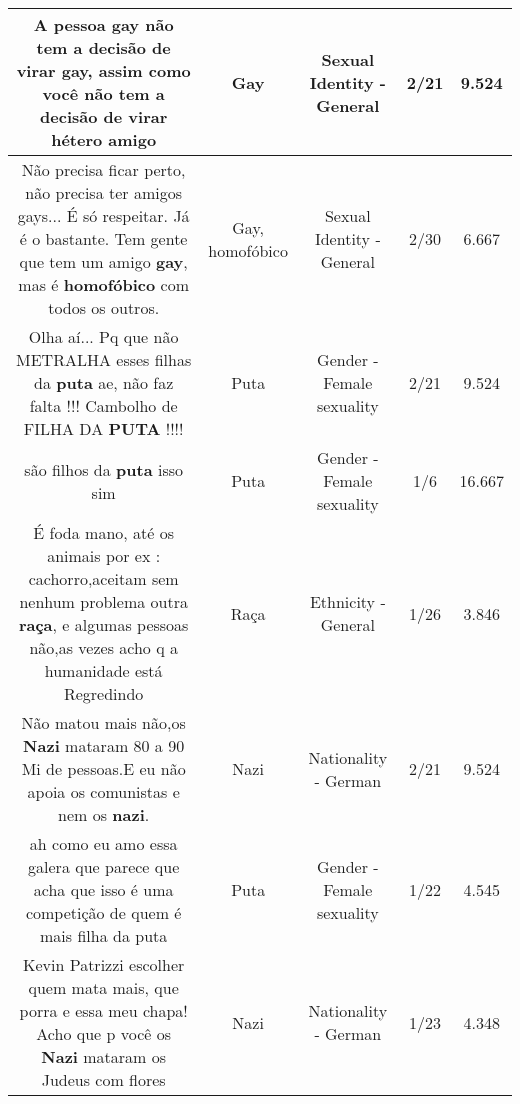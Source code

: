 \documentclass[11pt]{article}
\newlength\mylength
\begin{document}
\begin{center}
\begin{longtable}{|C{.65\mylength}|C{.30\mylength}|C{.12\mylength}|C{.12\mylength}|C{.12\mylength}|}
  \small A pessoa \textbf{gay} não tem a decisão de virar \textbf{gay}, assim como você não tem a decisão de virar hétero amigo\normalsize   & Gay & Sexual Identity - General & 2/21 & 9.524 \\  \hline
  \small Não precisa ficar perto, não precisa ter amigos gays... É só respeitar. Já é o bastante. Tem gente que tem um amigo \textbf{gay}, mas é \textbf{homofóbico} com todos os outros.\normalsize   & Gay, homofóbico & Sexual Identity - General & 2/30 & 6.667 \\  \hline
  \small Olha aí... Pq que não METRALHA esses filhas da \textbf{puta} ae, não faz falta !!! Cambolho de FILHA DA \textbf{PUTA} !!!!\normalsize   & Puta & Gender - Female sexuality & 2/21 & 9.524 \\  \hline
  \small são filhos da \textbf{puta} isso sim\normalsize   & Puta & Gender - Female sexuality & 1/6 & 16.667 \\  \hline
  \small É foda mano, até os animais por ex : cachorro,aceitam sem nenhum problema outra \textbf{raça}, e algumas pessoas não,as vezes acho q a humanidade está Regredindo\normalsize   & Raça & Ethnicity - General & 1/26 & 3.846 \\  \hline
  \small Não matou mais não,os \textbf{Nazi} mataram 80 a 90 Mi de pessoas.E eu não apoia os comunistas e nem os \textbf{nazi}.\normalsize   & Nazi & Nationality - German & 2/21 & 9.524 \\  \hline
  \small ah como eu amo essa galera que parece que acha que isso é uma competição de quem é mais filha da puta\normalsize   & Puta & Gender - Female sexuality & 1/22 & 4.545 \\  \hline
  \small Kevin Patrizzi escolher quem mata mais, que porra e essa meu chapa! Acho que p você os \textbf{Nazi} mataram os Judeus com flores\normalsize   & Nazi & Nationality - German & 1/23 & 4.348 \\  \hline

\end{longtable}
\end{center}
\end{document}
